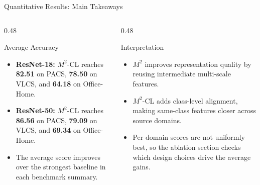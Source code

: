 \documentclass[t, aspectratio=169]{beamer} %
\begin{document}
	\begin{frame}{Quantitative Results: Main Takeaways}
		\begin{columns}[T]
			\begin{column}{0.48\textwidth}
				\begin{block}{Average Accuracy}
					\begin{itemize}
						\item \textbf{ResNet-18:} $M^2$-CL reaches \textbf{82.51} on PACS, \textbf{78.50} on VLCS, and \textbf{64.18} on Office-Home.
						\item \textbf{ResNet-50:} $M^2$-CL reaches \textbf{86.56} on PACS, \textbf{79.09} on VLCS, and \textbf{69.34} on Office-Home.
						\item The average score improves over the strongest baseline in each benchmark summary.
					\end{itemize}
				\end{block}
			\end{column}
			\begin{column}{0.48\textwidth}
				\begin{alertblock}{Interpretation}
					\begin{itemize}
						\item $M^2$ improves representation quality by reusing intermediate multi-scale features.
						\item $M^2$-CL adds class-level alignment, making same-class features closer across source domains.
						\item Per-domain scores are not uniformly best, so the ablation section checks which design choices drive the average gains.
					\end{itemize}
				\end{alertblock}
			\end{column}
		\end{columns}
	\end{frame}
\end{document}
